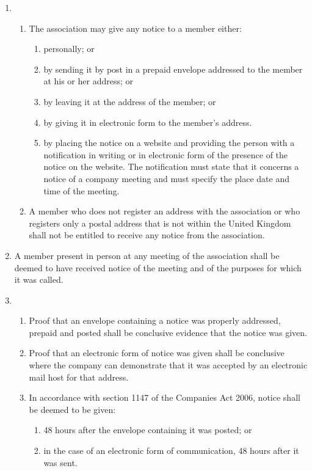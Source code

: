 \begin{enumerate}
\item
  \begin{enumerate}
  \item
    The association may give any notice to a member either:
    \begin{enumerate}
    \item
      personally; or
    \item
      by sending it by post in a prepaid envelope addressed to the member
      at his or her address; or
    \item
      by leaving it at the address of the member; or
    \item
      by giving it in electronic form to the member's address.
    \item
      by placing the notice on a website and providing the person with a
      notification in writing or in electronic form of the presence of
      the notice on the website. The notification must state that it
      concerns a notice of a company meeting and must specify the place
      date and time of the meeting.
    \end{enumerate}
  \item
    A member who does not register an address with the association or who
    registers only a postal address that is not within the United
    Kingdom shall not be entitled to receive any notice from the
    association.
  \end{enumerate}
\item
  A member present in person at any meeting of the association shall be
  deemed to have received notice of the meeting and of the purposes
  for which it was called.

\item
  \begin{enumerate}
  \item
    Proof that an envelope containing a notice was properly addressed,
    prepaid and posted shall be conclusive evidence that the notice was
    given.
  \item
    Proof that an electronic form of notice was given shall be
    conclusive where the company can demonstrate that it was
    accepted by an electronic mail host for that address.
  \item
    In accordance with section 1147 of the Companies Act 2006, notice
    shall be deemed to be given:
    \begin{enumerate}
    \item
      48 hours after the envelope containing it was posted; or
    \item
      in the case of an electronic form of communication, 48 hours after
      it was sent.
    \end{enumerate}
  \end{enumerate}


\end{enumerate}
